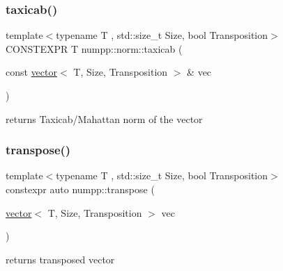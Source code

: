 \subsubsection{\texorpdfstring{taxicab()}{taxicab()}}
{\footnotesize\ttfamily template$<$typename T , std\+::size\+\_\+t Size, bool Transposition$>$ \\
C\+O\+N\+S\+T\+E\+X\+PR T numpp\+::norm\+::taxicab (\begin{DoxyParamCaption}\item[{const \hyperlink{classnumpp_1_1vector}{vector}$<$ T, Size, Transposition $>$ \&}]{vec }\end{DoxyParamCaption})}

returns Taxicab/\+Mahattan norm of the vector\mbox{\label{group__numpp__structures__vector_gab3289765a30dd71552bb3735d1eed2cb}} 
\subsubsection{\texorpdfstring{transpose()}{transpose()}}
{\footnotesize\ttfamily template$<$typename T , std\+::size\+\_\+t Size, bool Transposition$>$ \\
constexpr auto numpp\+::transpose (\begin{DoxyParamCaption}\item[{\hyperlink{classnumpp_1_1vector}{vector}$<$ T, Size, Transposition $>$}]{vec }\end{DoxyParamCaption})}

returns transposed vector